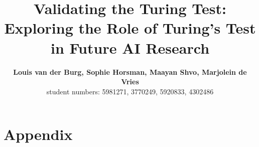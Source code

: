 \documentclass[10pt,letterpaper]{article}
\title{Validating the Turing Test: Exploring the Role of Turing’s Test in Future AI Research}
\author{{\large \bf Louis van der Burg, Sophie Horsman, Maayan Shvo, Marjolein de Vries} \\
   student numbers: 5981271, 3770249, 5920833, 4302486 \\
}
\begin{document}
\maketitle













\setlength{\bibleftmargin}{.125in}
\setlength{\bibindent}{-\bibleftmargin}



\clearpage
\section{Appendix}
   
   
   
   
\end{document}
